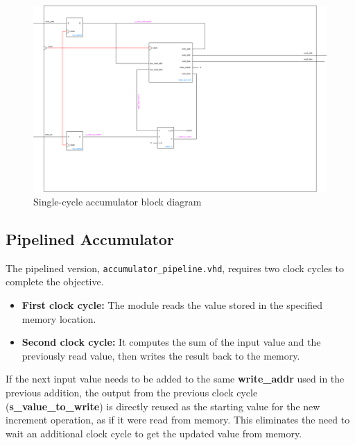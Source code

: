 \documentclass[a4paper,12pt]{article}
\begin{document}
\begin{figure}[H]
    \centering
    \includegraphics[width=1.0\linewidth]{accumulator_single_sycle.png}
    \caption{Single-cycle accumulator block diagram}
    \label{fig:single_cycle}
\end{figure}


\subsection{Pipelined Accumulator}
The pipelined version, \texttt{accumulator\_pipeline.vhd}, requires two clock cycles to complete the objective.
\begin{itemize}
    \item \textbf{First clock cycle:} The module reads the value stored in the specified memory location.
    \item \textbf{Second clock cycle:} It computes the sum of the input value and the previously read value, then writes the result back to the memory.
\end{itemize}
    

If the next input value needs to be added to the same \textbf{write\_addr} used in the previous addition, the output from the previous clock cycle (\textbf{s\_value\_to\_write}) is directly reused as the starting value for the new increment operation, as if it were read from memory. This eliminates the need to wait an additional clock cycle to get the updated value from memory.
\end{document}
